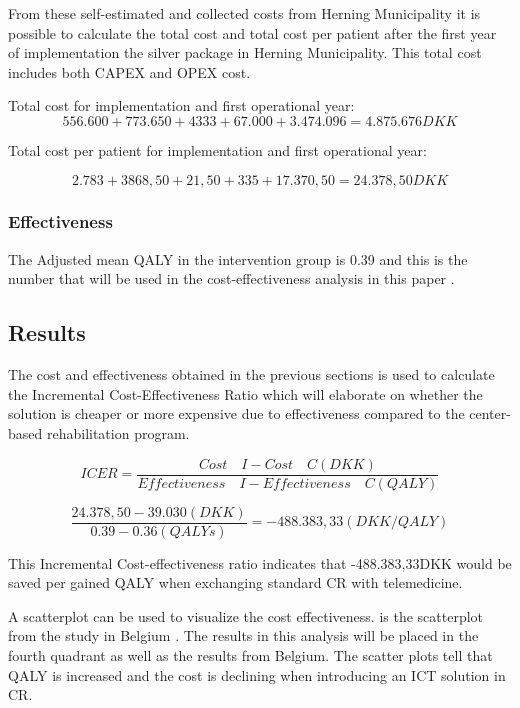 From these self-estimated and collected costs from Herning Municipality it is possible to calculate the total cost and total cost per patient after the first year of implementation the silver package in Herning Municipality. This total cost includes both CAPEX and OPEX cost.

Total cost for implementation and first operational year:
$$556.600 + 773.650 + 4333 + 67.000 + 3.474.096 = 4.875.676DKK$$

Total cost per patient for implementation and first operational year:

$$2.783+3868,50+21,50+335+17.370,50= 24.378,50DKK$$

\subsubsection{Effectiveness}

The Adjusted mean QALY in the intervention group is 0.39 and this is the number that will be used in the cost-effectiveness analysis in this paper \cite{costeffect}. 

\subsection{Results}

The cost and effectiveness obtained in the previous sections is used to calculate the Incremental Cost-Effectiveness Ratio which will elaborate on whether the solution is cheaper or more expensive due to effectiveness compared to the center-based rehabilitation program.  

$$ICER = \frac{Cost \quad I - Cost \quad C(DKK)}{Effectiveness \quad I - Effectiveness \quad C(QALY)}$$ 

$$\frac{24.378,50-39.030(DKK)}{0.39-0.36(QALYs)}=-488.383,33(DKK/QALY)$$ 

This Incremental Cost-effectiveness ratio indicates that -488.383,33DKK would be saved per gained QALY when exchanging standard CR with telemedicine. 

A scatterplot can be used to visualize the cost effectiveness.  is the scatterplot from the study in Belgium \cite{costeffect}. The results in this analysis will be placed in the fourth quadrant as well as the results from Belgium. The scatter plots tell that QALY is increased and the cost is declining when introducing an ICT solution in CR.  


